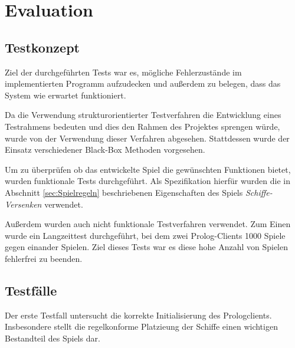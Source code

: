 \section{Evaluation} \label{sec:Evaluation}

\subsection{Testkonzept}

	Ziel der durchgeführten Tests war es, mögliche Fehlerzustände im implementierten Programm aufzudecken und außerdem zu belegen, dass das System
	wie erwartet funktioniert. 
	
	Da die Verwendung strukturorientierter Testverfahren die Entwicklung eines Testrahmens bedeuten und dies den Rahmen des Projektes sprengen würde,
	wurde von der Verwendung dieser Verfahren abgesehen.  
	Stattdessen wurde der Einsatz verschiedener Black-Box Methoden vorgesehen.
	
	Um zu überprüfen ob das entwickelte Spiel die gewünschten Funktionen bietet, wurden funktionale Tests durchgeführt. 
	Als Spezifikation hierfür wurden die in Abschnitt \ref{sec:Spielregeln} beschriebenen Eigenschaften des Spiels \textit{Schiffe-Versenken}
	verwendet. 
	
	
	Außerdem wurden auch nicht funktionale Testverfahren verwendet. Zum Einen wurde ein Langzeittest durchgeführt, bei dem zwei
	Prolog-Clients 1000 Spiele gegen einander Spielen. Ziel dieses Tests war es diese hohe Anzahl von Spielen fehlerfrei zu beenden. 	
	

\subsection{Testfälle}
	Der erste Testfall untersucht die korrekte Initialisierung des Prologclients. Insbesondere stellt die regelkonforme Platzieung der
	Schiffe einen wichtigen Bestandteil des Spiels dar. 
	
